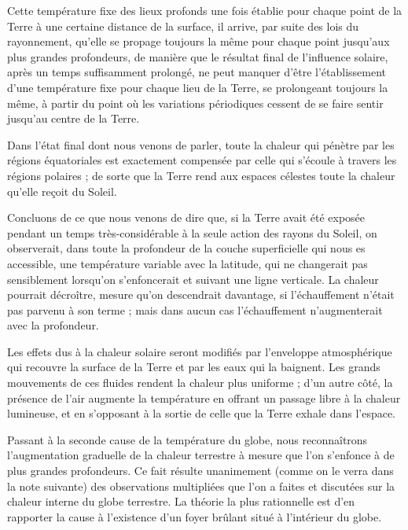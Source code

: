 \documentclass[a4paper, 11pt, oneside]{article}
\begin{document}
Cette température fixe des lieux profonds une fois établie pour chaque point de la Terre à une certaine distance de la surface, il arrive, par suite des lois du rayonnement, qu'elle se propage toujours la même pour chaque point jusqu'aux plus grandes profondeurs, de manière que le résultat final de l'influence solaire, après un temps suffisamment prolongé, ne peut manquer d'être l'établissement d'une température fixe pour chaque lieu de la Terre, se prolongeant toujours la même, à partir du point où les variations périodiques cessent de se faire sentir jusqu'au centre de la Terre.

Dans l'état final dont nous venons de parler, toute la chaleur qui pénètre par les régions équatoriales est exactement compensée par celle qui s'écoule à travers les régions polaires ; de sorte que la Terre rend aux espaces célestes toute la chaleur qu'elle reçoit du Soleil.

Concluons de ce que nous venons de dire que, si la Terre avait été exposée pendant un temps très-considérable à la seule action des rayons du Soleil, on observerait, dans toute la profondeur de la couche superficielle qui nous es accessible, une température variable avec la latitude, qui ne changerait pas sensiblement lorsqu'on s'enfoncerait et suivant une ligne verticale. La chaleur pourrait décroître, mesure qu'on descendrait davantage, si l'échauffement n'était pas parvenu à son terme ; mais dans aucun cas l'échauffement n'augmenterait avec la profondeur.

Les effets dus à la chaleur solaire seront modifiés par l'enveloppe atmosphérique qui recouvre la surface de la Terre et par les eaux qui la baignent. Les grands mouvements de ces fluides rendent la chaleur plus uniforme ; d'un autre côté, la présence de l'air augmente la température en offrant un passage libre à la chaleur lumineuse, et en s'opposant à la sortie de celle que la Terre exhale dans l'espace.

Passant à la seconde cause de la température du globe, nous reconnaîtrons l'augmentation graduelle de la chaleur terrestre à mesure que l'on s'enfonce à de plus grandes profondeurs. Ce fait résulte unanimement (comme on le verra dans la note suivante) des observations multipliées que l'on a faites et discutées sur la chaleur interne du globe terrestre. La théorie la plus rationnelle est d'en rapporter la cause à l'existence d'un foyer brûlant situé à l'intérieur du globe.
\end{document}
